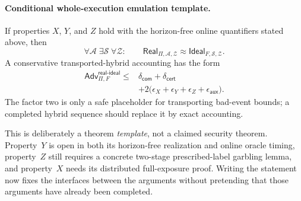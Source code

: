 \paragraph{Conditional whole-execution emulation template.}
If properties $X$, $Y$, and $Z$ hold with the horizon-free online quantifiers
stated above, then
\[
  \forall\mathcal A\;\exists\mathcal S\;\forall\mathcal Z:
  \qquad
  \mathsf{Real}_{\Pi,\mathcal A,\mathcal Z}
  \approx
  \mathsf{Ideal}_{F,\mathcal S,\mathcal Z}.
\]
A conservative transported-hybrid accounting has the form
\[
\begin{split}
  \mathsf{Adv}^{\mathsf{real\text{-}ideal}}_{\Pi,F}
  \leq{}& \delta_{\mathsf{com}}+\delta_{\mathsf{cert}}\\
        &+2\bigl(\epsilon_X+\epsilon_Y+\epsilon_Z
                 +\epsilon_{\mathsf{aux}}\bigr).
\end{split}
\]
The factor two is only a safe placeholder for transporting bad-event bounds;
a completed hybrid sequence should replace it by exact accounting.

This is deliberately a theorem \emph{template}, not a claimed security
theorem.  Property~$Y$ is open in both its horizon-free realization and online
oracle timing, property~$Z$ still requires a concrete two-stage
prescribed-label garbling lemma, and property~$X$ needs its distributed
full-exposure proof.  Writing the statement now fixes the interfaces between
the arguments without pretending that those arguments have already been
completed.
